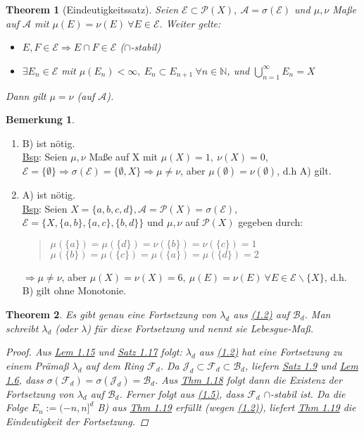 \documentclass[a4paper]{report}
\newcommand{\PowerSet}{\mathcal{P}}
\newcommand{\N}{\mathbb{N}}
\newcommand{\Borel}{\mathcal{B}}
\newcommand{\Bd}{\Borel_d}
\newcommand{\Fd}{\mathcal{F}_d}
\newcommand{\Jd}{\mathcal{J}_d}
\newcommand{\jlabel}[1]{\label{j_#1}}
\newcommand{\jhyperref}[2]{\hyperref[j_#1]{#2}}
\newcommand{\jlink}[1]{\jhyperref{#1}{#1}}
\theoremstyle{plain}
\newtheorem{thm}{Theorem}[chapter]
\theoremstyle{definition}
\newtheorem*{bem*}{Bemerkung}
\begin{document}
{{{\begin{thm}[Eindeutigkeitssatz]
\jlabel{Thm 1.19}
    Seien $\mathcal{E} \subset \PowerSet(X), \ \mathcal{A} = \sigma(\mathcal{E})$ und $\mu,\nu$ Maße auf $\mathcal{A}$ mit $\mu(E)=\nu(E) \ \forall E \in \mathcal{E}$. Weiter gelte:
    \begin{itemize}
        \item[A)] $E,F \in \mathcal{E} \Rightarrow E\cap F \in \mathcal{E}$ ($\cap$-stabil)
        \item[B)] $\exists E_n \in \mathcal{E}$ mit $\mu(E_n) < \infty,\ E_n \subset E_{n+1} \ \forall n\in\N$, und $\bigcup_{n=1}^\infty E_n = X$
    \end{itemize}
    Dann gilt $\mu = \nu$ (auf $\mathcal{A}$).
\end{thm}

\begin{bem*}
    \begin{enumerate}
        \item
            B) ist nötig.\\
            \uline{Bsp}: Seien $\mu,\nu$ Maße auf X mit $\mu(X)=1,\ \nu(X) = 0$, $\mathcal{E} = \{\emptyset\} \Rightarrow \sigma(\mathcal{E}) = \{\emptyset, X\} \Rightarrow \mu \neq \nu$, aber $\mu(\emptyset) =  \nu(\emptyset)$, d.h A) gilt.
        \item
            A) ist nötig.\\
            \uline{Bsp}: Seien $X=\{a,b,c,d\}, \mathcal{A}=\PowerSet(X)=\sigma(\mathcal{E}),$\\
            $\mathcal{E}=\{X, \{a,b\},\{a,c\},\{b,d\}\}$ und $\mu,\nu$ auf $\PowerSet(X)$ gegeben durch:
            \begin{quote}
                $\mu(\{a\})=\mu(\{d\})=\nu(\{b\})=\nu(\{c\})=1$\\
                $\mu(\{b\})=\mu(\{c\})=\mu(\{a\})=\mu(\{d\})=2$
            \end{quote}
            $\Rightarrow \mu\ne\nu$, aber $\mu(X)=\nu(X)=6,\ \mu(E)=\nu(E)\ \forall E\in \mathcal{E} \backslash \{X\}$, d.h. B) gilt ohne Monotonie.
    \end{enumerate}
\end{bem*}


\begin{thm}
\jlabel{Thm 1.20}
    Es gibt genau eine Fortsetzung von $\lambda_d$ aus \jlink{(1.2)} auf $\Bd$. Man schreibt $\lambda_d$ (oder $\lambda$) für diese Fortsetzung und nennt sie Lebesgue-Maß.
    \begin{proof}
        Aus \jlink{Lem 1.15} und \jlink{Satz 1.17} folgt: $\lambda_d$ aus \jlink{(1.2)} hat eine Fortsetzung zu einem Prämaß $\lambda_d$ auf dem Ring $\Fd$. Da $\Jd \subset \Fd \subset \Bd$, liefern \jlink{Satz 1.9} und \jlink{Lem 1.6}, dass $\sigma(\Fd)=\sigma(\Jd)=\Bd$. Aus \jlink{Thm 1.18} folgt dann die Existenz der Fortsetzung von $\lambda_d$ auf $\Bd$. Ferner folgt aus \jlink{(1.5)}, dass $\Fd$ $\cap$-stabil ist. Da die Folge $E_n := (-n,n]^d$ B) aus \jlink{Thm 1.19} erfüllt (wegen \jlink{(1.2)}), liefert \jlink{Thm 1.19} die Eindeutigkeit der Fortsetzung.
    \end{proof}
\end{thm}


}}}
\end{document}
